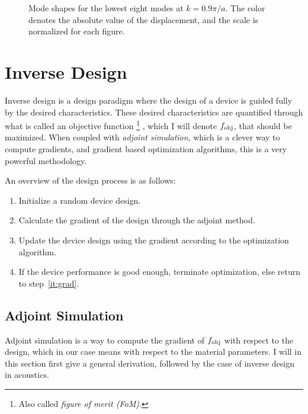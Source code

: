 \begin{figure}[htpb]
	\caption{%
		Mode shapes for the lowest eight modes at $k=0.9 \pi / a$.
		The color denotes the absolute value of the displacement,
		and the scale is normalized for each figure.
	}%
	\label{fig:modeshapes}
\end{figure}


\chapter{Inverse Design}

Inverse design is a design paradigm where the design of a device is guided fully by
the desired characteristics.
These desired characteristics are quantified through what is called an objective
function%
\footnote{Also called \emph{figure of merit (FoM)}.}%
, which I will denote $f_\text{obj}$,
that should be maximized.
When coupled with \emph{adjoint simulation}, which is a clever way to compute
gradients, and gradient based optimization
algorithms, this is a very powerful methodology.

An overview of the design process is as follows:
\begin{enumerate}
	\item Initialize a random device design.
	\item\label{it:grad} Calculate the gradient of the design through the adjoint method.
	\item Update the device design using the gradient according to the optimization algorithm.
	\item If the device performance is good enough, terminate optimization, else
		return to step~\ref{it:grad}.
\end{enumerate}

\section{Adjoint Simulation}

Adjoint simulation is a way to compute the gradient of $f_\text{obj}$ with respect to
the design, which in our case means with respect to the material parameters.
I will in this section first give a general derivation, followed by the case of
inverse design in acoustics.

